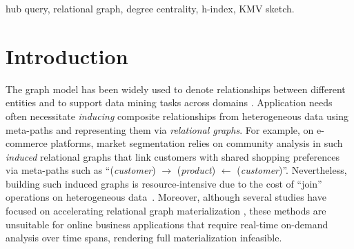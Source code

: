 \begin{abstract}
Relational graphs encapsulate nontrivial inherent interactions among entities in heterogeneous data sources. Identifying \emph{hubs} in relational graphs is vital in various applications such as fraud detection, influence analysis, and protein complex discovery. However, building relational graphs induced by meta-paths on heterogeneous data entails substantial costs, thus hindering efficient hub discovery. In this paper, we propose a novel sketch propagation framework for approximate hub queries in induced relational graphs that avoids explicitly materializing those graphs. Our framework specifically supports hub queries that ask for all nodes whose centrality scores, based on \emph{degree} or \emph{h-index}, are in the top quantile with provable guarantees under the notion of~$\epsilon$-separable sets. In addition, we devise pruning techniques that efficiently process \emph{personalized} hub queries asking whether a given node is a hub. Extensive experiments on real-world and synthetic data confirm the efficacy and efficiency of our proposals, which achieve orders of magnitude speed-ups over exact methods while consistently attaining accuracy beyond~90\%.
\end{abstract}
\begin{IEEEkeywords}
hub query, relational graph, degree centrality, h-index, KMV sketch.
\end{IEEEkeywords}


\section{Introduction}
\label{sec:intro}

The graph model has been widely used to denote relationships between different entities and to support data mining tasks across domains \cite{jiang2024spade+, ji2022detecting, li2024sefraud, liu2022user,niu2024discovering}. Application needs often necessitate \emph{inducing} composite relationships from heterogeneous data using meta-paths \cite{sun2011pathsim, fang2020effective, zheng2017entity} and representing them via \emph{relational graphs}. For example, on e-commerce platforms, market segmentation relies on community analysis in such \emph{induced} relational graphs that link customers with shared shopping preferences via meta-paths such as ``(\emph{customer}) $\rightarrow$ (\emph{product}) $\leftarrow$ (\emph{customer})''. Nevertheless, building such induced graphs is resource-intensive due to the cost of ``\textsf{join}'' operations on heterogeneous data~\cite{xirogiannopoulos2017extracting}. Moreover, although several studies have focused on accelerating relational graph materialization \cite{chatzopoulos2023atrapos, guo2024efficient, shi2016constrained, sun2011pathsim}, these methods are unsuitable for online business applications that require real-time on-demand analysis over time spans, rendering full materialization infeasible.

